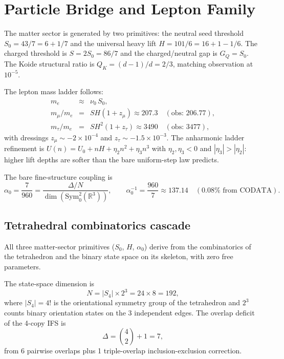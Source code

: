 \documentclass[11pt,twocolumn]{article}
\begin{document}
\section{Particle Bridge and Lepton Family}
\label{sec:matter}

The matter sector is generated by two primitives: the neutral seed threshold $S_0 = 43/7 = 6 + 1/7$ and the universal heavy lift $H = 101/6 = 16 + 1 - 1/6$.
The charged threshold is $S = 2S_0 = 86/7$ and the charged/neutral gap is $G_Q = S_0$.
The Koide structural ratio is $Q_K = (d-1)/d = 2/3$, matching observation at $10^{-5}$.

The lepton mass ladder follows:
\begin{eqnarray}
m_e &\approx& \nu_0\,S_0, \label{eq:me} \\
m_\mu/m_e &=& SH(1 + z_\mu) \approx 207.3 \quad(\text{obs: } 206.77), \label{eq:mmu} \\
m_\tau/m_e &=& SH^2(1 + z_\tau) \approx 3490 \quad(\text{obs: } 3477), \label{eq:mtau}
\end{eqnarray}
with dressings $z_\mu \sim -2\times10^{-4}$ and $z_\tau \sim -1.5\times10^{-3}$.
The anharmonic ladder refinement is $U(n) = U_0 + nH + \eta_2 n^2 + \eta_3 n^3$ with $\eta_2, \eta_3 < 0$ and $|\eta_3| > |\eta_2|$: higher lift depths are softer than the bare uniform-step law predicts.

The bare fine-structure coupling is
\begin{equation}
\label{eq:alpha}
\alpha_0 = \frac{7}{960} = \frac{\Delta/N}{\dim(\mathrm{Sym}^2_0(\mathbb{R}^3))}, \qquad \alpha_0^{-1} = \frac{960}{7} \approx 137.14 \quad(0.08\%\text{ from CODATA}).
\end{equation}

\subsection{Tetrahedral combinatorics cascade}
\label{sec:cascade}

All three matter-sector primitives ($S_0$, $H$, $\alpha_0$) derive from the combinatorics of the tetrahedron and the binary state space on its skeleton, with zero free parameters.

The state-space dimension is
\begin{equation}
\label{eq:N}
N = |S_4| \times 2^3 = 24 \times 8 = 192,
\end{equation}
where $|S_4| = 4!$ is the orientational symmetry group of the tetrahedron and $2^3$ counts binary orientation states on the 3 independent edges.
The overlap deficit of the 4-copy IFS is
\begin{equation}
\label{eq:Delta}
\Delta = \binom{4}{2} + 1 = 7,
\end{equation}
from 6 pairwise overlaps plus 1 triple-overlap inclusion-exclusion correction.
\end{document}
